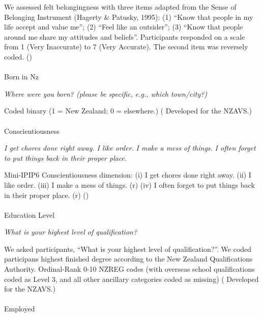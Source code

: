 \documentclass[
  single column]{article}
\makeatletter
\let\oldparagraph\paragraph
\renewcommand{\paragraph}{
    \@ifstar
      \xxxParagraphStar
      \xxxParagraphNoStar
  }
\newcommand{\xxxParagraphStar}[1]{\oldparagraph*{#1}\mbox{}}
\newcommand{\xxxParagraphNoStar}[1]{\oldparagraph{#1}\mbox{}}
\makeatother
\begin{document}
We assessed felt belongingness with three items adapted from the Sense
of Belonging Instrument (Hagerty \& Patusky, 1995): (1) ``Know that
people in my life accept and value me''; (2) ``Feel like an outsider'';
(3) ``Know that people around me share my attitudes and beliefs''.
Participants responded on a scale from 1 (Very Inaccurate) to 7 (Very
Accurate). The second item was reversely coded.
()

\paragraph{Born in Nz}\label{born-in-nz}

\emph{Where were you born? (please be specific, e.g., which town/city?)}

Coded binary (1 = New Zealand; 0 = elsewhere.)
( Developed for the
NZAVS.)

\paragraph{Conscientiousness}\label{conscientiousness}

\emph{I get chores done right away.} \emph{I like order.} \emph{I make a
mess of things.} \emph{I often forget to put things back in their proper
place.}

Mini-IPIP6 Conscientiousness dimension: (i) I get chores done right
away. (ii) I like order. (iii) I make a mess of things. (r) (iv) I often
forget to put things back in their proper place. (r)
()

\paragraph{Education Level}\label{education-level}

\emph{What is your highest level of qualification?}

We asked participants, ``What is your highest level of qualification?''.
We coded participans highest finished degree according to the New
Zealand Qualifications Authority. Ordinal-Rank 0-10 NZREG codes (with
overseas school qualifications coded as Level 3, and all other ancillary
categories coded as missing)
( Developed for the
NZAVS.)

\paragraph{Employed}\label{employed}
\end{document}
